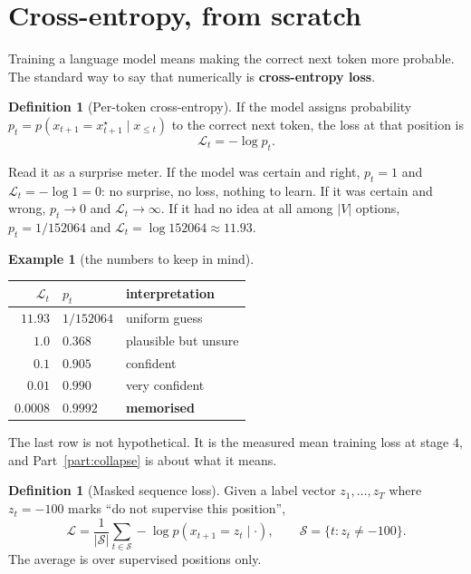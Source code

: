 \documentclass[11pt]{article}
\theoremstyle{definition}
\newtheorem{definition}[theorem]{Definition}
\newtheorem{example}[theorem]{Example}
\begin{document}
\section{Cross-entropy, from scratch}

Training a language model means making the correct next token more probable. The standard way to say that numerically is \textbf{cross-entropy loss}.

\begin{definition}[Per-token cross-entropy]
If the model assigns probability $p_t = p(x_{t+1}=x^\star_{t+1}\mid x_{\le t})$ to the correct next token, the loss at that position is
\[
\mathcal{L}_t = -\log p_t .
\]
\end{definition}

Read it as a surprise meter. If the model was certain and right, $p_t = 1$ and $\mathcal{L}_t = -\log 1 = 0$: no surprise, no loss, nothing to learn. If it was certain and wrong, $p_t \to 0$ and $\mathcal{L}_t \to \infty$. If it had no idea at all among $|V|$ options, $p_t = 1/152064$ and $\mathcal{L}_t = \log 152064 \approx 11.93$.

\begin{example}[the numbers to keep in mind]
\begin{center}
\begin{tabular}{rll}
\toprule
$\mathcal{L}_t$ & $p_t$ & interpretation\\
\midrule
$11.93$  & $1/152064$ & uniform guess \\
$1.0$    & $0.368$    & plausible but unsure \\
$0.1$    & $0.905$    & confident \\
$0.01$   & $0.990$    & very confident \\
$0.0008$ & $0.9992$   & \textbf{memorised} \\
\bottomrule
\end{tabular}
\end{center}
The last row is not hypothetical. It is the measured mean training loss at stage $4$, and Part~\ref{part:collapse} is about what it means.
\end{example}

\begin{definition}[Masked sequence loss]
Given a label vector $z_1,\dots,z_T$ where $z_t = -100$ marks ``do not supervise this position'',
\[
\mathcal{L} = \frac{1}{|\mathcal{S}|}\sum_{t \in \mathcal{S}} -\log p(x_{t+1} = z_t \mid \cdot),
\qquad
\mathcal{S} = \{t : z_t \neq -100\}.
\tag{7.1}
\]
The average is over supervised positions only.
\end{definition}
\end{document}
